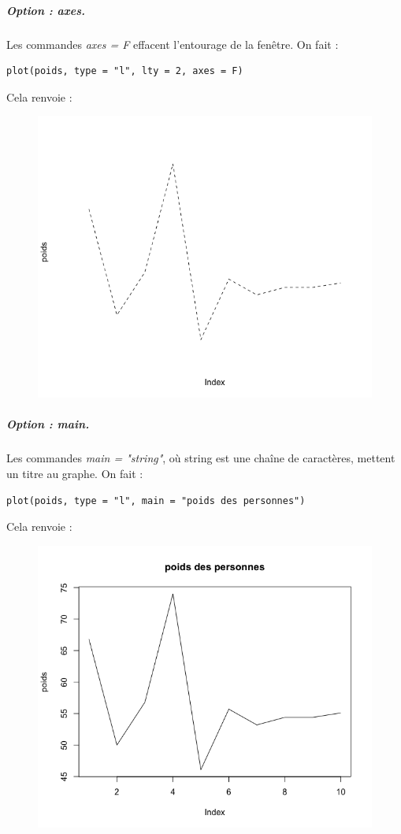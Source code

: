 \subparagraph{Option : axes.}
Les commandes \textit{axes = F} effacent l'entourage de la fenêtre.\newline
On fait : 
\begin{lstlisting}[language=html]
plot(poids, type = "l", lty = 2, axes = F)
\end{lstlisting}
Cela renvoie :
\begin{figure}[H]\begin{center}\includegraphics[scale=0.4]{ilu/gra23.png}\end{center}\end{figure}
\subparagraph{Option : main.}
Les commandes \textit{main = "string"}, où string est une chaîne de caractères, mettent un titre au graphe.\newline
On fait :
\begin{lstlisting}[language=html]
plot(poids, type = "l", main = "poids des personnes")
\end{lstlisting}
Cela renvoie :
\begin{figure}[H]\begin{center}\includegraphics[scale=0.4]{ilu/gra24.png}\end{center}\end{figure}
